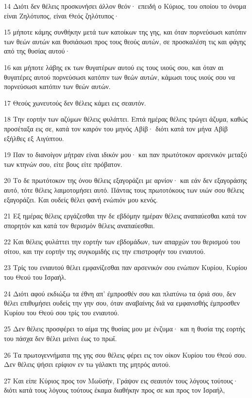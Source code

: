 \par 14 Διότι δεν θέλεις προσκυνήσει άλλον θεόν· επειδή ο Κύριος, του οποίου το όνομα είναι Ζηλότυπος, είναι Θεός ζηλότυπος·
\par 15 μήποτε κάμης συνθήκην μετά των κατοίκων της γης, και όταν πορνεύσωσι κατόπιν των θεών αυτών και θυσιάσωσι προς τους θεούς αυτών, σε προσκαλέση τις και φάγης από της θυσίας αυτού·
\par 16 και μήποτε λάβης εκ των θυγατέρων αυτού εις τους υιούς σου, και όταν αι θυγατέρες αυτού πορνεύσωσι κατόπιν των θεών αυτών, κάμωσι τους υιούς σου να πορνεύσωσι κατόπιν των θεών αυτών.
\par 17 Θεούς χωνευτούς δεν θέλεις κάμει εις σεαυτόν.
\par 18 Την εορτήν των αζύμων θέλεις φυλάττει. Επτά ημέρας θέλεις τρώγει άζυμα, καθώς προσέταξα εις σε, κατά τον καιρόν του μηνός Αβίβ· διότι κατά τον μήνα Αβίβ εξήλθες εξ Αιγύπτου.
\par 19 Παν το διανοίγον μήτραν είναι ιδικόν μου· και παν πρωτότοκον αρσενικόν μεταξύ των κτηνών σου, είτε βους είτε πρόβατον.
\par 20 Το δε πρωτότοκον της όνου θέλεις εξαγοράζει με αρνίον· και εάν δεν εξαγοράσης αυτό, τότε θέλεις λαιμοτομήσει αυτό. Πάντας τους πρωτοτόκους των υιών σου θέλεις εξαγοράζει. Και ουδείς θέλει φανή ενώπιόν μου κενός.
\par 21 Εξ ημέρας θέλεις εργάζεσθαι την δε εβδόμην ημέραν θέλεις αναπαύεσθαι κατά τον σπορητόν και κατά τον θερισμόν θέλεις αναπαύεσθαι.
\par 22 Και θέλεις φυλάττει την εορτήν των εβδομάδων, των απαρχών του θερισμού του σίτου, και την εορτήν της συγκομιδής εις την επιστροφήν του ενιαυτού.
\par 23 Τρίς του ενιαυτού θέλει εμφανίζεσθαι παν αρσενικόν σου ενώπιον Κυρίου, Κυρίου του Θεού του Ισραήλ.
\par 24 Διότι αφού εκδιώξω τα έθνη απ' έμπροσθέν σου και πλατύνω τα όριά σου, δεν θέλει επιθυμήσει ουδείς την γην σου, όταν αναβαίνης διά να εμφανισθής έμπροσθεν Κυρίου του Θεού σου τρίς του ενιαυτού.
\par 25 Δεν θέλεις προσφέρει το αίμα της θυσίας μου με ένζυμα· και η θυσία της εορτής του πάσχα δεν θέλει μείνει έως το πρωΐ.
\par 26 Τα πρωτογεννήματα της γης σου θέλεις φέρει εις τον οίκον Κυρίου του Θεού σου. Δεν θέλεις ψήσει ερίφιον εν τω γάλακτι της μητρός αυτού.
\par 27 Και είπε Κύριος προς τον Μωϋσήν, Γράψον εις σεαυτόν τους λόγους τούτους· διότι κατά τους λόγους τούτους έκαμα διαθήκην προς σε και προς τον Ισραήλ,
